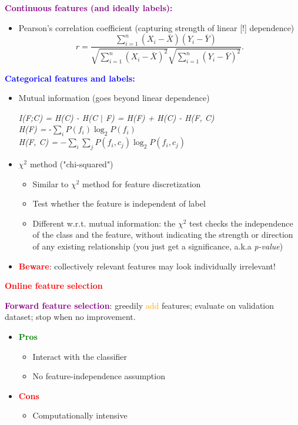 \documentclass[11pt]{article}
\begin{document}
\textbf{\textcolor{purple}{Continuous features (and ideally labels):}}
\begin{itemize}
	\item Pearson's correlation coefficient (capturing strength of linear [!] dependence)
		\[
			r = \frac{\sum_{i=1}^{n}(X_i - \bar{X})(Y_i - \bar{Y})}{\sqrt{\sum_{i=1}^{n}(X_i - \bar{X})^{2}} \sqrt{\sum_{i=1}^{n}(Y_i - \bar{Y})^{2}}} 
		.\] 
\end{itemize}

\textbf{\textcolor{blue}{Categorical features and labels:}}
\begin{itemize}
	\item Mutual information (goes beyond linear dependence)
		\begin{center}
			\textit{I(F;C) = H(C) - H(C $\mid$ F) = H(F) + H(C) - H(F, C)} \\
			\textit{H(F) =} -$\underset{i}{\sum} P(f_i) \log_2 P(f_i)$ \\
			\textit{H(F, C) =} $- \underset{i}{\sum} \underset{j}{\sum} P(f_i, c_j) \log_2 P(f_i, c_j)$ 
		\end{center}
	\item $\chi^{2}$ method ("chi-squared") 
		\begin{itemize}
			\item Similar to $\chi^{2}$ method for feature discretization
	\item Test whether the feature is independent of label
	\item Different w.r.t. mutual information: the $\chi^{2}$ test checks the independence of the class and the feature, without indicating the strength or direction of any existing relationship (you just get a significance, a.k.a \textit{p-value})
\end{itemize}
	\item \textbf{\textcolor{red}{Beware}}: collectively relevant features may look individually irrelevant!		
\end{itemize}


\textbf{\textcolor{red}{Online feature selection}}

\textbf{\textcolor{purple}{Forward feature selection}}: greedily \textcolor{orange}{add} features; evaluate on validation dataset; stop when no improvement. 

\begin{itemize}
	\item \textbf{\textcolor{green}{Pros}}
		\begin{itemize}
			\item Interact with the classifier
			\item No feature-independence assumption
		\end{itemize}
	\item \textbf{\textcolor{red}{Cons}}
		\begin{itemize}
			\item Computationally intensive
		\end{itemize}
\end{itemize}
\end{document}
